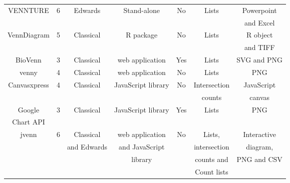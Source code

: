 \documentclass{bmcart}
\begin{document}
\begin{backmatter}
\begin{table}[h!]
\begin{tabular}{c|cccccc}
		VENNTURE \cite{Bronwen2012} &  6 & Edwards & Stand-alone & No & Lists &
		Powerpoint\\ 
		& & & & & & and Excel \\ \hline
		
		VennDiagram \cite{RVennDiagram} &  5 & Classical & R package & No & Lists
		& R object \\
		& & & & & & and TIFF \\ \hline
		
		BioVenn \cite{Hulsen2008} &  3 & Classical & web application & Yes &
		Lists & SVG and PNG \\ \hline
		
		venny \cite{venny} &  4 & Classical & web application & No &
		Lists & PNG \\ \hline
		 
		Canvasxpress \cite{canvasxpress} &  4 & Classical & JavaScript library &
		No & Intersection & JavaScript \\
		& & & & & counts & canvas \\ \hline
		
		Google & 3 & Classical & JavaScript library &
		Yes & Lists & PNG \\ 
		Chart API \cite{googleAPI} & & & & & & \\ \hline \hline
			
		jvenn & 6 & Classical & web application & No & Lists,
		& Interactive 
		\\
		& & and Edwards & and JavaScript & & intersection & diagram, \\
		& & & library & & counts and & PNG and CSV \\
		& & & & & Count lists & 
	\end{tabular}
\end{table}



\end{backmatter}
\end{document}
